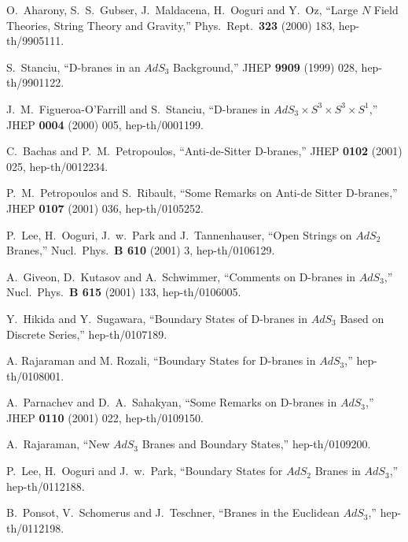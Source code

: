 \documentclass[a4paper,12pt]{article}
\begin{document}
\begin{thebibliography}{99}

O.~Aharony, S.~S.~Gubser, J.~Maldacena, H.~Ooguri and Y.~Oz,
``Large $N$ Field Theories, String Theory and Gravity,''
Phys.\ Rept.\  {\bf 323} (2000) 183,
hep-th/9905111. 

S.~Stanciu,
``D-branes in an $AdS_3$ Background,''
JHEP {\bf 9909} (1999) 028,
hep-th/9901122.

J.~M.~Figueroa-O'Farrill and S.~Stanciu,
``D-branes in $AdS_3 \times S^3 \times S^3 \times S^1$,''
JHEP {\bf 0004} (2000) 005,
hep-th/0001199.

C.~Bachas and P.~M.~Petropoulos,
``Anti-de-Sitter D-branes,''
JHEP {\bf 0102} (2001) 025,
hep-th/0012234.

P.~M.~Petropoulos and S.~Ribault,
``Some Remarks on Anti-de Sitter D-branes,''
JHEP {\bf 0107} (2001) 036, hep-th/0105252.

P.~Lee, H.~Ooguri, J.~w.~Park and J.~Tannenhauser,
``Open Strings on $AdS_2$ Branes,''
Nucl.\ Phys.\ {\bf B 610} (2001) 3, hep-th/0106129.

A.~Giveon, D.~Kutasov and A.~Schwimmer,
``Comments on D-branes in $AdS_3$,''
Nucl.\ Phys.\ {\bf B 615} (2001) 133, hep-th/0106005.

Y.~Hikida and Y.~Sugawara,
``Boundary States of D-branes in $AdS_3$ Based on Discrete Series,''
hep-th/0107189.

A. Rajaraman and M. Rozali,
``Boundary States for D-branes in $AdS_3$,'' hep-th/0108001.

A.~Parnachev and D.~A.~Sahakyan,
``Some Remarks on D-branes in $AdS_3$,''
JHEP {\bf 0110} (2001) 022, hep-th/0109150.


A.~Rajaraman,
``New $AdS_3$ Branes and Boundary States,''
hep-th/0109200.

P.~Lee, H.~Ooguri and J.~w.~Park,
``Boundary States for $AdS_2$ Branes in $AdS_3$,'' hep-th/0112188.

B.~Ponsot, V.~Schomerus and J.~Teschner,
``Branes in the Euclidean $AdS_3$,'' hep-th/0112198.


\end{thebibliography}
\end{document}
